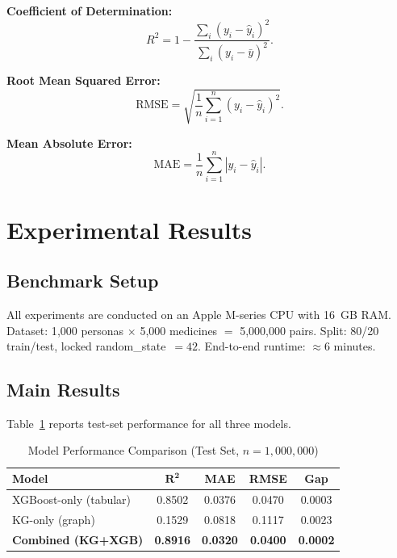\documentclass[10pt,journal,compsoc]{IEEEtran}
\begin{document}
\textbf{Coefficient of Determination:}
\begin{equation}
  R^2 = 1 - \frac{\sum_i(y_i-\hat{y}_i)^2}{\sum_i(y_i-\bar{y})^2}.
  \label{eq:r2}
\end{equation}

\textbf{Root Mean Squared Error:}
\begin{equation}
  \text{RMSE} = \sqrt{\frac{1}{n}\sum_{i=1}^{n}(y_i-\hat{y}_i)^2}.
  \label{eq:rmse}
\end{equation}

\textbf{Mean Absolute Error:}
\begin{equation}
  \text{MAE} = \frac{1}{n}\sum_{i=1}^{n}|y_i-\hat{y}_i|.
  \label{eq:mae}
\end{equation}

\section{Experimental Results}
\label{sec:results}

\subsection{Benchmark Setup}

All experiments are conducted on an Apple M-series CPU with 16~GB RAM.
Dataset: 1{,}000 personas $\times$ 5{,}000 medicines $=$ 5{,}000{,}000 pairs.
Split: 80/20 train/test, locked random\_state~$=42$.
End-to-end runtime: $\approx$6 minutes.

\subsection{Main Results}

Table~\ref{tab:main_results} reports test-set performance for all three models.

\begin{table}[!t]
\caption{Model Performance Comparison (Test Set, $n=1{,}000{,}000$)}
\label{tab:main_results}
\centering
\begin{tabular}{lcccc}
\toprule
\textbf{Model} & $\boldsymbol{R^2}$ & \textbf{MAE} & \textbf{RMSE} & \textbf{Gap} \\
\midrule
XGBoost-only (tabular)  & 0.8502 & 0.0376 & 0.0470 & 0.0003 \\
KG-only (graph)         & 0.1529 & 0.0818 & 0.1117 & 0.0023 \\
\textbf{Combined (KG+XGB)} & \textbf{0.8916} & \textbf{0.0320} & \textbf{0.0400} & \textbf{0.0002} \\
\bottomrule
\end{tabular}
\end{table}
\end{document}
